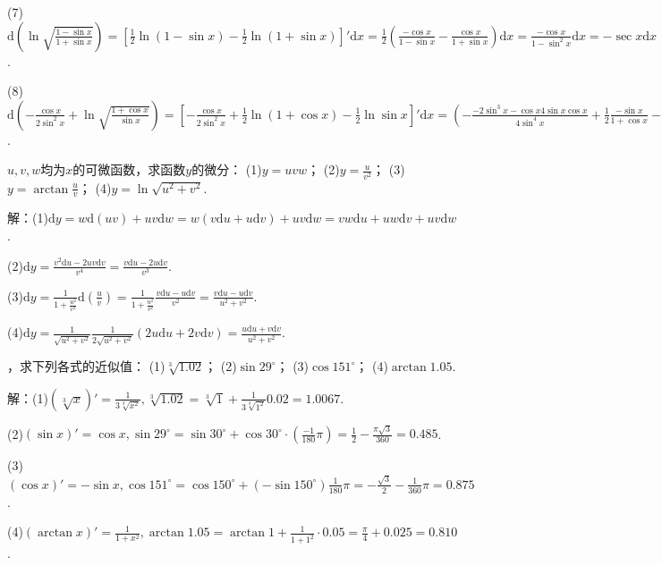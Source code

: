 \documentclass[12pt,UTF8]{ctexart}
\begin{document}
\begin{enumerate}
(7)$\mathrm d(\ln\sqrt{\frac{1-\sin x}{1+\sin x}})=[\frac12\ln(1-\sin x)-\frac12\ln(1+\sin x)]'\mathrm dx=\frac12(\frac{-\cos x}{1-\sin x}-\frac{\cos x}{1+\sin x})\mathrm dx=\frac{-\cos x}{1-\sin^2x}\mathrm dx=-\sec x\mathrm dx$.

(8)$\mathrm d(-\frac{\cos x}{2\sin^2x}+\ln\sqrt{\frac{1+\cos x}{\sin x}})=[-\frac{\cos x}{2\sin^2x}+\frac12\ln(1+\cos x)-\frac12\ln\sin x]'\mathrm dx=(-\frac{-2\sin^3x-\cos x4\sin x\cos x}{4\sin^4x}+\frac12\frac{-\sin x}{1+\cos x}-\frac12\frac{\cos x}{\sin x})\mathrm dx=(\frac{1+\cos^2x}{2\sin^3x}-\frac12\frac{\sin x}{1+\cos x}-\frac12\cot x)\mathrm dx=\sec x\cot^2x\mathrm dx$.

$u,v,w$均为$x$的可微函数，求函数$y$的微分：
\newline
(1)$y=uvw$；
\newline
(2)$y=\frac u{v^2}$；
\newline
(3)$y=\arctan\frac uv$；
\newline
(4)$y=\ln\sqrt{u^2+v^2}$.

解：(1)$\mathrm dy=w\mathrm d(uv)+uv\mathrm dw=w(v\mathrm du+u\mathrm dv)+uv\mathrm dw=vw\mathrm du+uw\mathrm dv+uv\mathrm dw$.

(2)$\mathrm dy=\frac{v^2\mathrm du-2uv\mathrm dv}{v^4}=\frac{v\mathrm du-2u\mathrm dv}{v^3}$.

(3)$\mathrm dy=\frac1{1+\frac{u^2}{v^2}}\mathrm d(\frac uv)=\frac1{1+\frac{u^2}{v^2}}\frac{v\mathrm du-u\mathrm dv}{v^2}=\frac{v\mathrm du-u\mathrm dv}{u^2+v^2}$.

(4)$\mathrm dy=\frac1{\sqrt{u^2+v^2}}\frac1{2\sqrt{u^2+v^2}}(2u\mathrm du+2v\mathrm dv)=\frac{u\mathrm du+v\mathrm dv}{u^2+v^2}$.

，求下列各式的近似值：
\newline
(1)$\sqrt[3]{1.02}$；
\newline
(2)$\sin29^\circ$；
\newline
(3)$\cos151^\circ$；
\newline
(4)$\arctan1.05$.

解：(1)$(\sqrt[3]x)'=\frac1{3\sqrt[3]{x^2}},\sqrt[3]{1.02}=\sqrt[3]1+\frac1{3\sqrt[3]{1^2}}0.02=1.0067$.

(2)$(\sin x)'=\cos x,\sin29^\circ=\sin30^\circ+\cos30^\circ\cdot(\frac{-1}{180}\pi)=\frac12-\frac{\pi\sqrt3}{360}=0.485$.

(3)$(\cos x)'=-\sin x,\cos151^\circ=\cos150^\circ+(-\sin150^\circ)\frac1{180}\pi=-\frac{\sqrt3}2-\frac1{360}\pi=0.875$.

(4)$(\arctan x)'=\frac1{1+x^2},\arctan1.05=\arctan1+\frac1{1+1^2}\cdot0.05=\frac\pi4+0.025=0.810$.


\end{enumerate}
\end{document}
